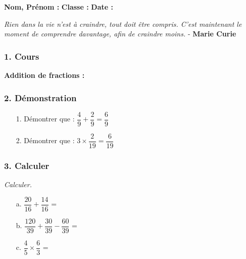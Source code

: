 



\textbf{Nom, Prénom :} \hspace{8cm} \textbf{Classe :} \hspace{3cm} \textbf{Date :}\\

\begin{center}
  \textit{Rien dans la vie n'est à craindre, tout doit être compris. C'est maintenant le moment de comprendre davantage, afin de craindre moins.}  - \textbf{Marie Curie}
\end{center}

\subsubsection*{1. Cours}

\textbf{Addition de fractions : } \dotfill \\
\Pointilles[1]

\subsubsection*{2. Démonstration}

\begin{multicols}{2}
\begin{enumerate}
  \item[1.] Démontrer que : $\dfrac{4}{9} + \dfrac{2}{9} = \dfrac{6}{9}$ 
  \item[2.] Démontrer que : $3 \times \dfrac{2}{19} = \dfrac{6}{19}$ 
\end{enumerate}
\end{multicols}

\Pointilles[14]

\subsubsection*{3. Calculer}
\textit{Calculer.}

\begin{multicols}{3}
\begin{enumerate}
  \item[a.] $\dfrac{20}{16} + \dfrac{14}{16}$ = \dotfill 
  \item[b.] $\dfrac{120}{39} + \dfrac{30}{39} - \dfrac{60}{39}$ = \dotfill 
  \item[c.] $\dfrac{4}{5} \times \dfrac{6}{3}$ = \dotfill 
\end{enumerate}
\end{multicols}

